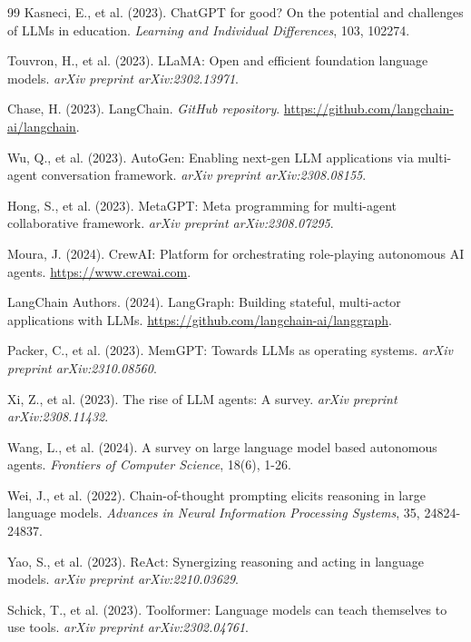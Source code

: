 \documentclass[12pt, a4paper]{article}
\begin{document}
\begin{thebibliography}{99}
Kasneci, E., et al. (2023). ChatGPT for good? On the potential and challenges of LLMs in education. \textit{Learning and Individual Differences}, 103, 102274.

Touvron, H., et al. (2023). LLaMA: Open and efficient foundation language models. \textit{arXiv preprint arXiv:2302.13971}.

Chase, H. (2023). LangChain. \textit{GitHub repository}. \url{https://github.com/langchain-ai/langchain}.

Wu, Q., et al. (2023). AutoGen: Enabling next-gen LLM applications via multi-agent conversation framework. \textit{arXiv preprint arXiv:2308.08155}.

Hong, S., et al. (2023). MetaGPT: Meta programming for multi-agent collaborative framework. \textit{arXiv preprint arXiv:2308.07295}.

Moura, J. (2024). CrewAI: Platform for orchestrating role-playing autonomous AI agents. \url{https://www.crewai.com}.

LangChain Authors. (2024). LangGraph: Building stateful, multi-actor applications with LLMs. \url{https://github.com/langchain-ai/langgraph}.

Packer, C., et al. (2023). MemGPT: Towards LLMs as operating systems. \textit{arXiv preprint arXiv:2310.08560}.

Xi, Z., et al. (2023). The rise of LLM agents: A survey. \textit{arXiv preprint arXiv:2308.11432}.

Wang, L., et al. (2024). A survey on large language model based autonomous agents. \textit{Frontiers of Computer Science}, 18(6), 1-26.

Wei, J., et al. (2022). Chain-of-thought prompting elicits reasoning in large language models. \textit{Advances in Neural Information Processing Systems}, 35, 24824-24837.

Yao, S., et al. (2023). ReAct: Synergizing reasoning and acting in language models. \textit{arXiv preprint arXiv:2210.03629}.

Schick, T., et al. (2023). Toolformer: Language models can teach themselves to use tools. \textit{arXiv preprint arXiv:2302.04761}.


\end{thebibliography}
\end{document}
